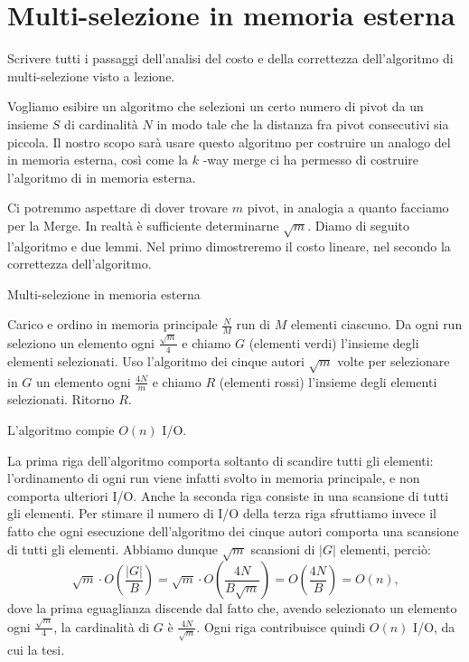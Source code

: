 \chapter{Multi-selezione in memoria esterna}    

\begin{problem*}
    Scrivere tutti i passaggi dell'analisi del costo e della correttezza
    dell'algoritmo di multi-selezione visto a lezione.
\end{problem*}

Vogliamo esibire un algoritmo che selezioni un certo numero di pivot da un
insieme \(S\) di cardinalit\`a \(N\) in modo tale che la distanza fra pivot
consecutivi sia piccola. Il nostro scopo sar\`a usare questo algoritmo per
costruire un analogo del \quicksort in memoria esterna, cos\`i come la \(k\)
-way merge ci ha permesso di costruire l'algoritmo di \mergesort in 
memoria esterna.

Ci potremmo aspettare di dover trovare \(m\) pivot, in analogia a quanto
facciamo per la Merge. In realt\`a \`e sufficiente determinarne \(\sqrt{m}\).
Diamo di seguito l'algoritmo e due lemmi. Nel primo dimostreremo il costo
lineare, nel secondo la correttezza dell'algoritmo.

\begin{algorithm}
    \caption{Multi-selezione in memoria esterna}
    \begin{algorithmic}[1]
        \State Carico e ordino in memoria principale \(\frac{N}{M}\) run
        di \(M\) elementi ciascuno.
        \State Da ogni run seleziono un elemento ogni 
        \(\frac{\sqrt{m}}{4}\) e chiamo \(G\) (elementi verdi) l'insieme 
        degli elementi selezionati.
        \State Uso l'algoritmo dei cinque autori \(\sqrt{m}\) volte per
        selezionare in \(G\) un elemento ogni \(\frac{4N}{m}\) e chiamo 
        \(R\) (elementi rossi) l'insieme degli elementi selezionati.
        \State Ritorno \(R\).
    \end{algorithmic}
\end{algorithm}

\begin{lemma}[Costo]
    L'algoritmo compie \(O(n)\) I/O.
\end{lemma}
\begin{proof*}
    La prima riga dell'algoritmo comporta soltanto di scandire tutti gli
    elementi: l'ordinamento di ogni run viene infatti svolto in memoria
    principale, e non comporta ulteriori I/O. Anche la seconda riga
    consiste in una scansione di tutti gli elementi. Per stimare il numero
    di I/O della terza riga sfruttiamo invece il fatto che ogni esecuzione
    dell'algoritmo dei cinque autori comporta una scansione di tutti gli
    elementi. Abbiamo dunque \(\sqrt{m}\) scansioni di \(|G|\) elementi,
    perci\`o:
    \[
        \sqrt{m}\cdot O\left(\frac{|G|}{B}\right) = \sqrt{m}\cdot O\left(\frac{4N}{B\sqrt{m}}\right) = O\left(\frac{4N}{B}\right) = O(n)\mbox{,}
    \]
    dove la prima eguaglianza discende dal fatto che, avendo selezionato
    un elemento ogni \(\frac{\sqrt{m}}{4}\), la cardinalit\`a di \(G\) \`e
    \(\frac{4N}{\sqrt{m}}\). Ogni riga contribuisce quindi \(O(n)\) I/O, da cui la tesi.
\end{proof*}

